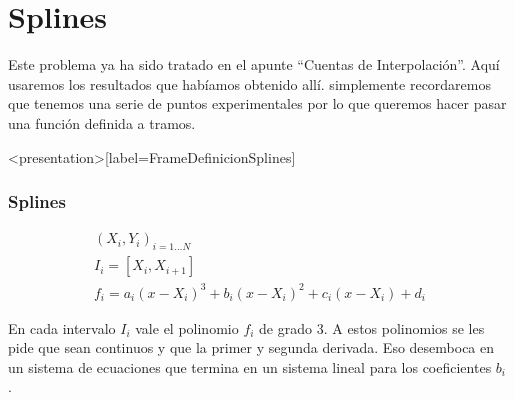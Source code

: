 \section{Splines}


Este problema ya ha sido tratado en el apunte ``Cuentas 
de Interpolación''. Aquí usaremos los resultados que habíamos obtenido allí.
simplemente recordaremos que tenemos una serie de puntos experimentales 
por lo que queremos hacer pasar una función definida a tramos. 

\mode*
\begin{frame}<presentation>[label=FrameDefinicionSplines]
  \frametitle{Splines}
  \begin{equation}
    \begin{split}
    { (X_i, Y_i) }_{i = 1 \dots N}\\
      I_i = \left[ X_i , X_{i+1} \right] \\
      f_i = a_i (x - X_i)^3 + b_i (x-X_i)^2 + c_i (x-X_i) + d_i
    \end{split}
  \end{equation}
\end{frame}

En cada intervalo $I_i$ vale el polinomio $f_i$ de grado 3. A estos polinomios
se les pide que sean continuos y que la primer y segunda derivada. Eso 
desemboca en un sistema de ecuaciones que termina en un sistema lineal para
los coeficientes $b_i$ . 

